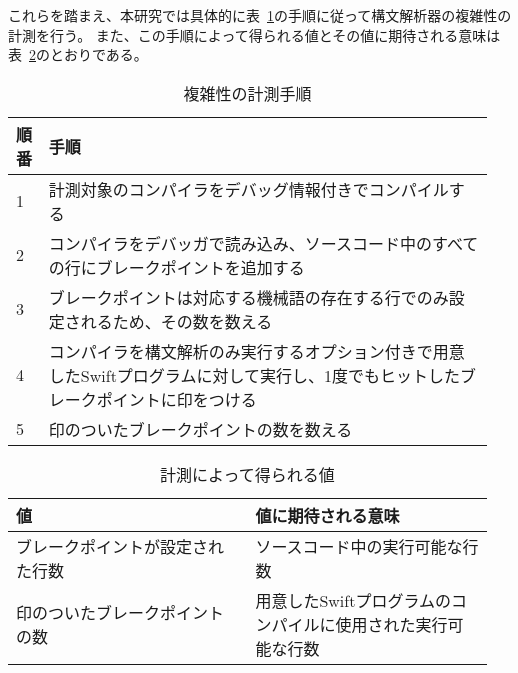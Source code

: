 これらを踏まえ、本研究では具体的に表~\ref{table:complexity-measure}の手順に従って構文解析器の複雑性の計測を行う。
また、この手順によって得られる値とその値に期待される意味は表~\ref{table:complexity-value}のとおりである。

\begin{table}[!hbtp]
    \begin{center}
        \caption{複雑性の計測手順}
        \begin{tabular}{|p{0.05\linewidth}|p{0.9\linewidth}|}
            \hline
            順番 & 手順 \\
            \hline
            \hline
            1 & 計測対象のコンパイラをデバッグ情報付きでコンパイルする \\
            \hline
            2 & コンパイラをデバッガで読み込み、ソースコード中のすべての行にブレークポイントを追加する \\
            \hline
            3 & ブレークポイントは対応する機械語の存在する行でのみ設定されるため、その数を数える \\
            \hline
            4 & コンパイラを構文解析のみ実行するオプション付きで用意したSwiftプログラムに対して実行し、1度でもヒットしたブレークポイントに印をつける \\
            \hline
            5 & 印のついたブレークポイントの数を数える \\
            \hline
        \end{tabular}
        \label{table:complexity-measure}
    \end{center}
\end{table}

\begin{table}[!hbtp]
    \begin{center}
        \caption{計測によって得られる値}
        \begin{tabular}{|p{0.475\linewidth}|p{0.475\linewidth}|}
            \hline
            値 & 値に期待される意味 \\
            \hline
            \hline
            ブレークポイントが設定された行数 & ソースコード中の実行可能な行数 \\
            \hline
            印のついたブレークポイントの数 & 用意したSwiftプログラムのコンパイルに使用された実行可能な行数 \\
            \hline
        \end{tabular}
        \label{table:complexity-value}
    \end{center}
\end{table}

